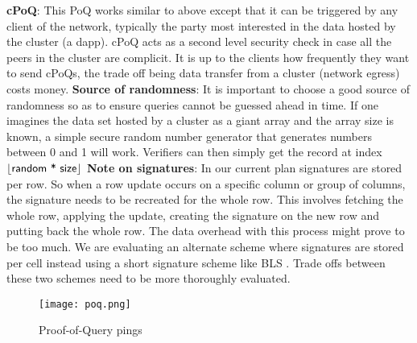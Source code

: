 \newline
\textbf{cPoQ}: This \textsf{PoQ} works similar to above except that it can be triggered by any client of the network, typically the party most interested in the data hosted by the cluster (a dapp). \textsf{cPoQ} acts as a second level security check in case all the peers in the cluster are complicit. It is up to the clients how frequently they want to send \textsf{cPoQ}s, the trade off being data transfer from a cluster (network egress) costs money.
\newline
\newline
\textbf{Source of randomness}: It is important to choose a good source of randomness so as to ensure queries cannot be guessed ahead in time. If one imagines the data set hosted by a cluster as a giant array and the array size is known, a simple secure random number generator that generates numbers between 0 and 1 will work. Verifiers can then simply get the record at index $ \lfloor\textsf{random * size}\rfloor $
\newline
\newline
\textbf{Note on signatures}: In our current plan signatures are stored per row. So when a row update occurs on a specific column or group of columns, the signature needs to be recreated for the whole row. This involves fetching the whole row, applying the update, creating the signature on the new row and putting back the whole row. The data overhead with this process might prove to be too much. We are evaluating an alternate scheme where signatures are stored per cell instead using a short signature scheme like BLS \cite{bls}. Trade offs between these two schemes need to be more thoroughly evaluated.
\begin{figure}[h!] \centering
	\texttt{[image: poq.png]}
	\caption{\textsf{Proof-of-Query} pings}
	\label{fig:poq}
\end{figure}
